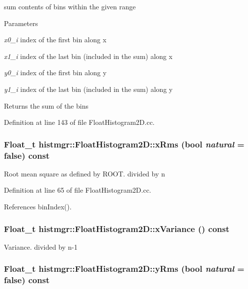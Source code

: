 sum contents of bins within the given range 
\begin{DoxyParams}{Parameters}
\item[{\em x0\_\-i}]index of the first bin along x \item[{\em x1\_\-i}]index of the last bin (included in the sum) along x \item[{\em y0\_\-i}]index of the first bin along y \item[{\em y1\_\-i}]index of the last bin (included in the sum) along y \end{DoxyParams}
\begin{DoxyReturn}{Returns}
the sum of the bins 
\end{DoxyReturn}


Definition at line 143 of file FloatHistogram2D.cc.
\subsubsection[{xRms}]{\setlength{\rightskip}{0pt plus 5cm}Float\_\-t histmgr::FloatHistogram2D::xRms (bool {\em natural} = {\ttfamily false}) const}\label{classhistmgr_1_1FloatHistogram2D_a59c99c39c90a49a62de6678728ced198}


Root mean square as defined by ROOT. divided by n 

Definition at line 65 of file FloatHistogram2D.cc.

References binIndex().
\subsubsection[{xVariance}]{\setlength{\rightskip}{0pt plus 5cm}Float\_\-t histmgr::FloatHistogram2D::xVariance () const}\label{classhistmgr_1_1FloatHistogram2D_a96200287a4d48feeb7ae60832c760315}


Variance. divided by n-\/1 
\subsubsection[{yRms}]{\setlength{\rightskip}{0pt plus 5cm}Float\_\-t histmgr::FloatHistogram2D::yRms (bool {\em natural} = {\ttfamily false}) const}\label{classhistmgr_1_1FloatHistogram2D_a44b5d22fb5fe27a9bac978cac174201a}


